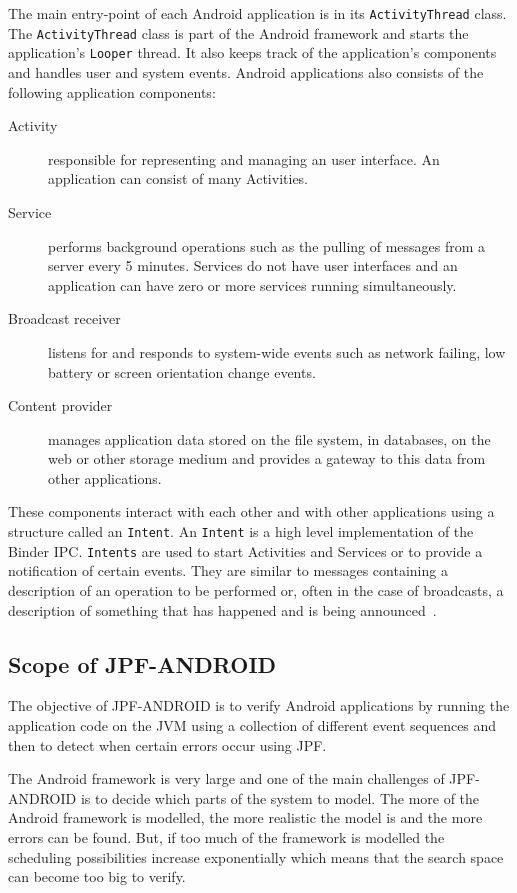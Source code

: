 \documentclass{acm_proc_article-sp}
\begin{document}
The main entry-point of each Android application is in its \texttt{ActivityThread} class. The \texttt{ActivityThread} class is part of the
Android framework and starts the application's \texttt{Looper} thread. It also keeps track of the application's components and handles user
and system events. Android applications also consists of the following application components:
\vspace{-10pt}
\begin{description}
\item [Activity] responsible for representing and managing an user interface. An application can consist of many
Activities.
\item [Service] performs background operations such as the pulling of messages from a server every 5 minutes. Services do not have user
interfaces and an application can have zero or more services running simultaneously.
\item [Broadcast receiver] listens for and responds to system-wide events such as network failing, low battery or screen orientation
change events.
\item [Content provider] manages application data stored on the file system, in databases, on the web or other storage medium and provides a
gateway to this data from other applications.
\end{description}
\vspace{-5pt}
These components interact with each other and with other applications using a structure called an \texttt{Intent}. An \texttt{Intent} is a
high level implementation of the Binder IPC. \texttt{Intents} are used to start Activities and Services or to provide a notification of
certain events. They are similar to messages containing a description of an operation to be performed or, often in the case of broadcasts, a
description of something that has happened and is being announced~\cite{AndroidDocs}.

\subsection{Scope of JPF-ANDROID}
The objective of JPF-ANDROID is to verify Android applications by running the application code on the JVM using a collection of different
event sequences and then to detect when certain errors occur using JPF.

The Android framework is very large and one of the main challenges of JPF-ANDROID is to decide which parts of the system to model. The more
of the Android framework is modelled, the more realistic the model is and the more errors can be found. But, if too much
of the framework is modelled the scheduling possibilities increase exponentially which means that the search space can become too big to
verify.
\end{document}

